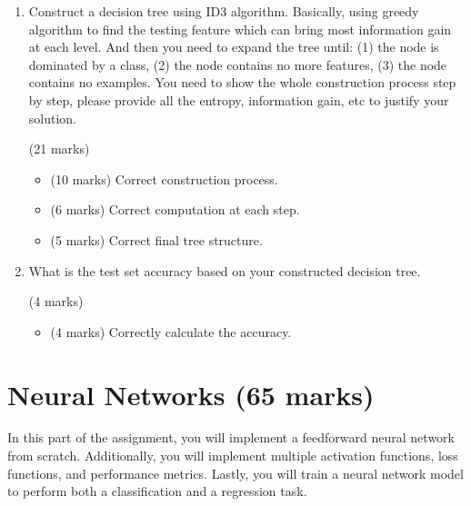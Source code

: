 \documentclass[12pt]{article}
\begin{document}
\begin{enumerate}[font=\Large,label=(\alph*)]
    
    \item Construct a decision tree using ID3 algorithm. Basically, using greedy algorithm to find the testing feature which can bring most information gain at each level. And then you need to expand the tree until: (1) the node is dominated by a class, (2) the node contains no more features, (3) the node contains no examples. You need to show the whole construction process step by step, please provide all the entropy, information gain, etc to justify your solution.
    
    \begin{markscheme}
    (21 marks)
    
    \begin{itemize}
        \item (10 marks) Correct construction process.
        \item (6 marks) Correct computation at each step.
        \item (5 marks) Correct final tree structure.
    \end{itemize}

    \end{markscheme}


    \item What is the test set accuracy based on your constructed decision tree. 
    
    \begin{markscheme}
    (4 marks)
    
    \begin{itemize}
        \item (4 marks) Correctly calculate the accuracy.
    \end{itemize}

    \end{markscheme}
    
\end{enumerate}

\newpage

\section{Neural Networks (65 marks)}

In this part of the assignment, you will implement a feedforward neural network from scratch. Additionally, you will implement multiple activation functions, loss functions, and performance metrics. Lastly, you will train a neural network model to perform both a classification and a regression task. 
\end{document}

